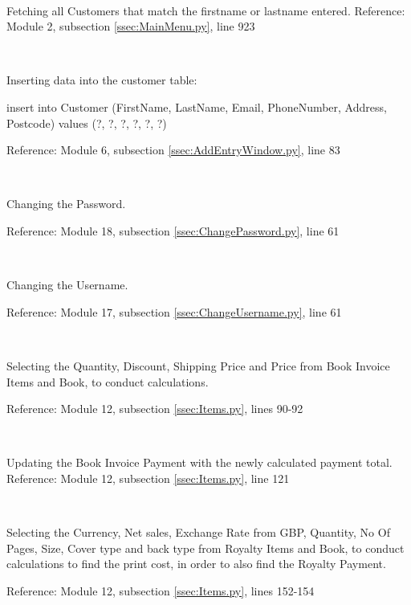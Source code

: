\

Fetching all Customers that match the firstname or lastname entered.
Reference: Module 2,  subsection \ref{ssec:MainMenu.py}, line 923

\

Inserting data into the customer table:
\begin{sql}
insert into Customer 
(FirstName, LastName, Email, PhoneNumber, Address, Postcode) 
values (?, ?, ?, ?, ?, ?)
\end{sql}
Reference: Module 6,  subsection \ref{ssec:AddEntryWindow.py}, line 83

\

Changing the Password.
\begin{tiny}
\end{tiny}
Reference: Module 18,  subsection \ref{ssec:ChangePassword.py}, line 61

\

Changing the Username.
\begin{small}
\end{small}
Reference: Module 17,  subsection \ref{ssec:ChangeUsername.py}, line 61

\

Selecting the Quantity, Discount, Shipping Price and Price from Book Invoice Items and Book, to conduct calculations.
\begin{tiny}
\end{tiny}
Reference: Module 12,  subsection \ref{ssec:Items.py}, lines 90-92

\

Updating the Book Invoice Payment with the newly calculated payment total.
Reference: Module 12,  subsection \ref{ssec:Items.py}, line 121

\

Selecting the Currency, Net sales, Exchange Rate from GBP, Quantity, No Of Pages, Size, Cover type and back type from Royalty Items and Book, to conduct calculations to find the print cost, in order to also find the Royalty Payment.
\begin{tiny}
\end{tiny}
Reference: Module 12,  subsection \ref{ssec:Items.py}, lines 152-154

